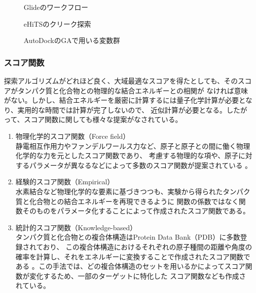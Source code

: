 \begin{figure}[htb]
 \begin{center}
  \caption{Glideのワークフロー\cite{Friesner2004}}
  \label{fig:glide_flowchart}
 \end{center}
\end{figure}
\begin{figure}[htb]
 \begin{center}
  \caption{eHiTSのクリーク探索}
  \label{fig:eHiTS_clique}
 \end{center}
\end{figure}
\begin{figure}[htb]
 \begin{center}
  \caption{AutoDockのGAで用いる変数群}
  \label{fig:AutoDock_gene}
 \end{center}
\end{figure}


\subsubsection{スコア関数}
探索アルゴリズムがどれほど良く、大域最適なスコアを得たとしても、そのスコアがタンパク質と化合物との物理的な結合エネルギーとの相関が
なければ意味がない。しかし、結合エネルギーを厳密に計算するには量子化学計算が必要となり、実用的な時間では計算が完了しないので、
近似計算が必要となる。したがって、スコア関数に関しても様々な提案がなされている。
\begin{enumerate}
\item 物理化学的スコア関数（Force field）\\
	静電相互作用力やファンデルワールス力など、原子と原子との間に働く物理化学的な力を元としたスコア関数であり、
	考慮する物理的な項や、原子に対するパラメータが異なるなどによって多数のスコア関数が提案されている
	\cite{Morris1998, Ewing2001, Jones1997}。
\item 経験的スコア関数（Empirical）\\
	水素結合など物理化学的な要素に基づきつつも、実験から得られたタンパク質と化合物との結合エネルギーを再現できるように
	関数の係数ではなく関数そのものをパラメータ化することによって作成されたスコア関数である\cite{Wang2002, Gehlhaar1995, Eldridge1997}。
\item 統計的スコア関数（Knowledge-based）\\
	タンパク質と化合物との複合体構造はProtein Data Bank（PDB）\cite{Berman2000}に多数登録されており、
	この複合体構造におけるそれぞれの原子種間の距離や角度の確率を計算し、それをエネルギーに変換することで作成されたスコア関数である
	\cite{Muegge2006, Xue2010, Gohlke2000, Huang2010}。この手法では、どの複合体構造のセットを用いるかによってスコア関数が変化するため、一部のターゲットに特化した
	スコア関数なども作成されている\cite{Seifert2009}。
\end{enumerate}

